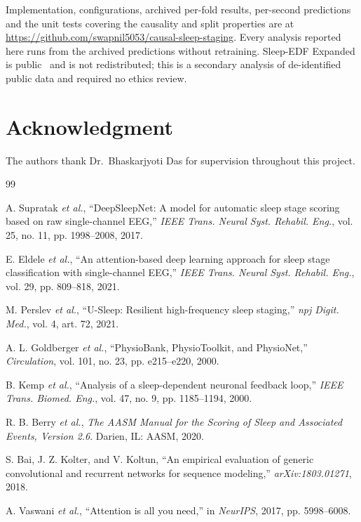 \documentclass[conference]{IEEEtran}
\begin{document}
Implementation, configurations, archived per-fold results, per-second predictions and the unit tests
covering the causality and split properties are at
\url{https://github.com/swapnil5053/causal-sleep-staging}. Every analysis reported here runs from the
archived predictions without retraining. Sleep-EDF Expanded is public~\cite{physionet,kemp} and is not
redistributed; this is a secondary analysis of de-identified public data and required no ethics review.

\section*{Acknowledgment}

The authors thank Dr.\ Bhaskarjyoti Das for supervision throughout this project.

\begin{thebibliography}{99}
\small

 A. Supratak \emph{et al.}, ``DeepSleepNet: A model for automatic sleep stage
scoring based on raw single-channel EEG,'' \emph{IEEE Trans. Neural Syst. Rehabil. Eng.}, vol. 25,
no. 11, pp. 1998--2008, 2017.

 E. Eldele \emph{et al.}, ``An attention-based deep learning approach for sleep
stage classification with single-channel EEG,'' \emph{IEEE Trans. Neural Syst. Rehabil. Eng.},
vol. 29, pp. 809--818, 2021.

 M. Perslev \emph{et al.}, ``U-Sleep: Resilient high-frequency sleep staging,''
\emph{npj Digit. Med.}, vol. 4, art. 72, 2021.

 A. L. Goldberger \emph{et al.}, ``PhysioBank, PhysioToolkit, and PhysioNet,''
\emph{Circulation}, vol. 101, no. 23, pp. e215--e220, 2000.

 B. Kemp \emph{et al.}, ``Analysis of a sleep-dependent neuronal feedback loop,''
\emph{IEEE Trans. Biomed. Eng.}, vol. 47, no. 9, pp. 1185--1194, 2000.

 R. B. Berry \emph{et al.}, \emph{The AASM Manual for the Scoring of Sleep and
Associated Events, Version 2.6}. Darien, IL: AASM, 2020.

 S. Bai, J. Z. Kolter, and V. Koltun, ``An empirical evaluation of generic convolutional
and recurrent networks for sequence modeling,'' \emph{arXiv:1803.01271}, 2018.

 A. Vaswani \emph{et al.}, ``Attention is all you need,'' in \emph{NeurIPS}, 2017,
pp. 5998--6008.


\end{thebibliography}
\end{document}
